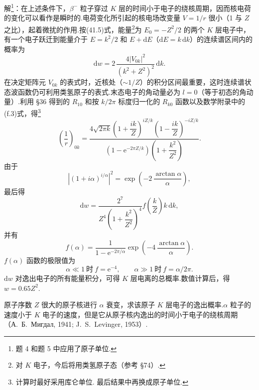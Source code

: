 \begin{xiti}
解\footnote{题 4 和题 5 中应用了原子单位.}：在上述条件下，$\beta^-$ 粒子穿过 $K$ 层的时间小于电子的绕核周期，因而核电荷的变化可以看作是瞬时的.电荷变化所引起的核电场改变量 $V=1/r$ 很小（1 与 $Z$ 之比），起着微扰的作用.按(41.5)式，能量\footnote{对 $K$ 电子，今后将用类氢原子态（参考 §74）.}为 $E_0=-Z^2/2$ 的两个 $K$ 层电子中，有一个电子跃迁到能量介于 $E=k^2/2$ 和 $E+\mathrm{d}E$（$\mathrm{d}E=k\,\mathrm{d}k$）的连续谱区间内的概率为
\begin{equation*}
  \mathrm{d}w=2\,\frac{4|V_{0k}|^2}{\left(k^2+Z^2\right)^2}\,\mathrm{d}k.
\end{equation*}
在决定矩阵元 $V_{0k}$ 的表式时，近核处（$\sim1/Z$）的积分区间最重要，这时连续谱状态波函数仍可利用类氢原子的表式.末态电子的角动量必为 $l=0$（等于初态的角动量）.利用 §36 得到的 $R_{10}$ 和按 $k/2\pi$ 标度归一化的 $R_{k0}$ 函数以及数学附录中的(f.3)式，得\footnote{计算时最好采用库仑单位. 最后结果中再换成原子单位.}
\begin{equation*}
  \left(\frac{1}{r}\right)_{0k}
  =\frac{4\sqrt{2\pi k}\left(1+\dfrac{ik}{Z}\right)^{iZ/k}
  \left(1-\dfrac{ik}{Z}\right)^{-iZ/k}}
  {\left(1-\mathrm{e}^{-2\pi Z/k}\right)\left(1+\dfrac{k^2}{Z^2}\right)}.
\end{equation*}
由于
\begin{equation*}
  \left|\left(1+i\alpha\right)^{i/\alpha}\right|^2
  =\exp\left(-2\,\frac{\arctan\alpha}{\alpha}\right),
\end{equation*}
最后得
\begin{equation*}
  \mathrm{d}w=\frac{2^7}{Z^4\left(1+\dfrac{k^2}{Z^2}\right)^4}
  f\left(\frac{k}{Z}\right)k\,\mathrm{d}k,
\end{equation*}
并有
\begin{equation*}
  f(\alpha)=\frac{1}{1-\mathrm{e}^{-2\pi/\alpha}}
  \exp\left(-4\,\frac{\arctan\alpha}{\alpha}\right).
\end{equation*}
$f(\alpha)$ 函数的极限值为
\begin{equation*}
  \alpha\ll1\ \text{时}\ f=\mathrm{e}^{-4},\qquad
  \alpha\gg1\ \text{时}\ f=\alpha/2\pi.
\end{equation*}
$\mathrm{d}w$ 对逸出电子的所有能量积分，可得 $K$ 层电离的总概率.数值计算后，得 $w=0.65Z^2$.

\quad 原子序数 $Z$ 很大的原子核进行 $\alpha$ 衰变，求该原子 $K$ 层电子的逸出概率.$\alpha$ 粒子的速度小于 $K$ 电子的速度，但是它从原子核内逸出的时间小于电子的绕核周期（А.~Б.~Мигдал, 1941; J.~S.~Levinger, 1953）.


\end{xiti}
